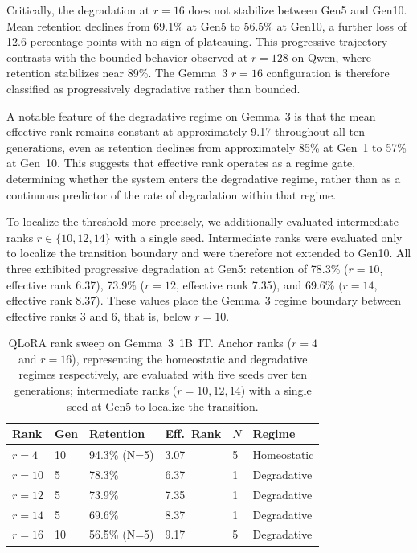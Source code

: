 \documentclass[a4paper,fleqn]{cas-dc}
\newif\ifshowchanges
\newcommand{\rev}[1]{\ifshowchanges{\color{blue}#1}\else{#1}\fi}
\begin{document}
Critically, the degradation at $r=16$ does not stabilize between Gen5 and
Gen10. Mean retention declines from 69.1\% at Gen5 to 56.5\% at Gen10, a
further loss of 12.6 percentage points with no sign of plateauing. This
progressive trajectory contrasts with the bounded behavior observed at $r=128$
on Qwen, where retention stabilizes near 89\%. The Gemma~3 $r=16$
configuration is therefore classified as progressively degradative rather than
bounded.

A notable feature of the degradative regime on Gemma~3 is that the mean
effective rank remains constant at approximately 9.17 throughout all ten
generations, \rev{even as retention declines from approximately 85\% at Gen~1 to 57\% at Gen~10}. This suggests that
effective rank operates as a regime gate, determining whether the system
enters the degradative regime, rather than as a continuous predictor of the
rate of degradation within that regime.

To localize the threshold more precisely, we additionally evaluated intermediate
ranks $r \in \{10, 12, 14\}$ with a single seed. Intermediate ranks were
evaluated only to localize the transition boundary and were therefore not
extended to Gen10. All three exhibited progressive
degradation at Gen5: retention of 78.3\% ($r=10$, effective rank 6.37), 73.9\%
($r=12$, effective rank 7.35), and 69.6\% ($r=14$, effective rank 8.37). These
values place the Gemma~3 regime boundary between effective ranks 3 and 6, \rev{that is, below $r=10$}.

\begin{table}[width=.95\linewidth,cols=6,pos=htbp]
\caption{QLoRA rank sweep on Gemma~3~1B~IT. Anchor ranks ($r=4$ and $r=16$),
representing the homeostatic and degradative regimes respectively,
are evaluated with five seeds over ten generations; intermediate ranks
($r=10,12,14$) with a single seed at Gen5 to localize the transition.}\label{tab:gemma3}
\begin{tabular*}{\tblwidth}{@{} llllll@{} }
\toprule
Rank & Gen & Retention & Eff.\ Rank & \rev{$N$} & Regime \\
\midrule
$r=4$   & 10 & 94.3\% (N=5) & 3.07  & \rev{5} & Homeostatic \\
$r=10$  & 5  & 78.3\%       & 6.37  & \rev{1} & Degradative \\
$r=12$  & 5  & 73.9\%       & 7.35  & \rev{1} & Degradative \\
$r=14$  & 5  & 69.6\%       & 8.37  & \rev{1} & Degradative \\
$r=16$  & 10 & 56.5\% (N=5) & 9.17  & \rev{5} & Degradative \\
\bottomrule
\end{tabular*}
\end{table}
\end{document}
